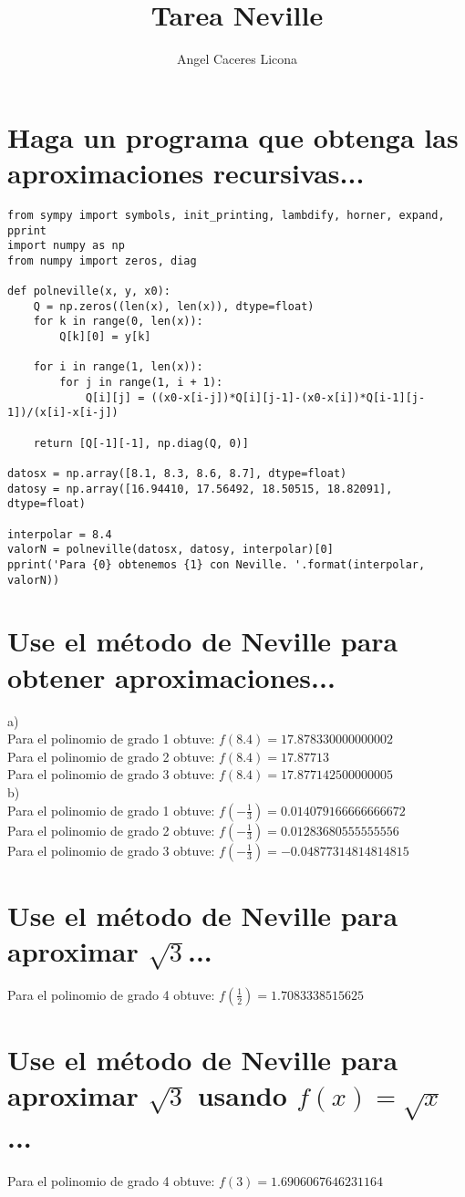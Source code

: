 \documentclass{article}
\begin{document}
\title{Tarea Neville}
\author{Angel Caceres Licona}

\maketitle


\section{Haga un programa que obtenga las aproximaciones recursivas...}

\begin{lstlisting}
from sympy import symbols, init_printing, lambdify, horner, expand, pprint
import numpy as np
from numpy import zeros, diag

def polneville(x, y, x0):
    Q = np.zeros((len(x), len(x)), dtype=float)
    for k in range(0, len(x)):
        Q[k][0] = y[k]

    for i in range(1, len(x)):
        for j in range(1, i + 1):
            Q[i][j] = ((x0-x[i-j])*Q[i][j-1]-(x0-x[i])*Q[i-1][j-1])/(x[i]-x[i-j])

    return [Q[-1][-1], np.diag(Q, 0)]

datosx = np.array([8.1, 8.3, 8.6, 8.7], dtype=float)
datosy = np.array([16.94410, 17.56492, 18.50515, 18.82091], dtype=float)

interpolar = 8.4
valorN = polneville(datosx, datosy, interpolar)[0]
pprint('Para {0} obtenemos {1} con Neville. '.format(interpolar, valorN))
\end{lstlisting}

\section{Use el método de Neville para obtener aproximaciones...}
a)\\
Para el polinomio de grado 1 obtuve: $f(8.4) = 17.878330000000002$\\
Para el polinomio de grado 2 obtuve: $f(8.4) = 17.87713$\\
Para el polinomio de grado 3 obtuve: $f(8.4) = 17.877142500000005$\\

b)\\
Para el polinomio de grado 1 obtuve: $f(-\frac{1}{3}) = 0.014079166666666672$\\
Para el polinomio de grado 2 obtuve: $f(-\frac{1}{3}) = 0.01283680555555556$\\
Para el polinomio de grado 3 obtuve: $f(-\frac{1}{3}) = -0.04877314814814815$\\

\section{Use el método de Neville para aproximar $\sqrt{3}$...}

Para el polinomio de grado 4 obtuve: $f(\frac{1}{2}) = 1.7083338515625$\\

\section{Use el método de Neville para aproximar $\sqrt{3}$ usando $f(x)=\sqrt{x}$...}

Para el polinomio de grado 4 obtuve: $f(3) = 1.6906067646231164$\\
\end{document}
